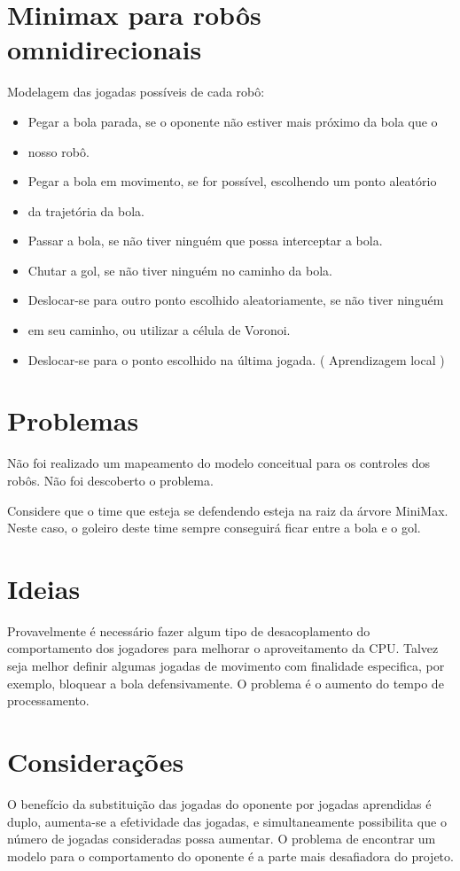\section{Minimax para robôs omnidirecionais}
Modelagem das jogadas possíveis de cada robô:
\begin{itemize}
 \item Pegar a bola parada, se o oponente não estiver mais próximo da bola que o
 \item nosso robô.
 \item Pegar a bola em movimento, se for possível, escolhendo um ponto aleatório
 \item da trajetória da bola.
 \item Passar a bola, se não tiver ninguém que possa interceptar a bola.
 \item Chutar a gol, se não tiver ninguém no caminho da bola.
 \item Deslocar-se para outro ponto escolhido aleatoriamente, se não tiver ninguém
 \item em seu caminho, ou utilizar a célula de Voronoi.
 \item Deslocar-se para o ponto escolhido na última jogada. ( Aprendizagem local )
\end{itemize}

\section{Problemas}
Não foi realizado um mapeamento do modelo conceitual para os
controles dos robôs. Não foi descoberto o problema.

Considere que o time que esteja se defendendo esteja na raiz da árvore MiniMax.
Neste caso, o goleiro deste time sempre conseguirá ficar entre a bola e o gol.

\section{Ideias}
Provavelmente é necessário fazer algum tipo de desacoplamento do comportamento dos
jogadores para melhorar o aproveitamento da CPU\@.
Talvez seja melhor definir algumas jogadas de movimento com finalidade especifica,
por exemplo, bloquear a bola defensivamente. O problema é o aumento do tempo de
processamento.

\section{Considerações}
O benefício da substituição das jogadas do oponente por jogadas aprendidas é duplo,
aumenta-se a efetividade das jogadas, e simultaneamente possibilita que o
número de jogadas consideradas possa aumentar. O problema de encontrar um
modelo para o comportamento do oponente é a parte mais desafiadora do projeto.
